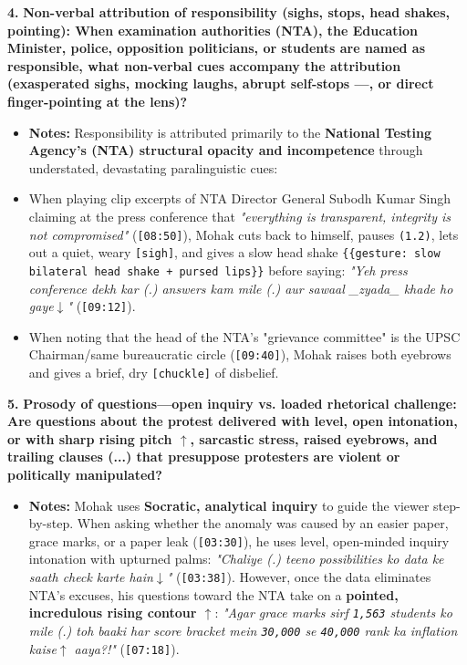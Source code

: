 \documentclass[10pt,a4paper]{article}
\begin{document}
\noindent\textbf{4.} \textbf{Non-verbal attribution of responsibility (sighs, stops, head shakes, pointing): When examination authorities (NTA), the Education Minister, police, opposition politicians, or students are named as responsible, what non-verbal cues accompany the attribution (exasperated sighs, mocking laughs, abrupt self-stops ---, or direct finger-pointing at the lens)?}\par\smallskip
\begin{itemize}
  \item \textbf{Notes:}
Responsibility is attributed primarily to the \textbf{National Testing Agency's (NTA) structural opacity and incompetence} through understated, devastating paralinguistic cues:\par\smallskip
  \item When playing clip excerpts of NTA Director General Subodh Kumar Singh claiming at the press conference that \textit{"everything is transparent, integrity is not compromised"} (\texttt{[08:50]}), Mohak cuts back to himself, pauses \texttt{(1.2)}, lets out a quiet, weary \texttt{[sigh]}, and gives a slow head shake \texttt{\{\{gesture: slow bilateral head shake + pursed lips\}\}} before saying: \textit{"Yeh press conference dekh kar (.) answers kam mile (.) aur sawaal \_zyada\_ khade ho gaye$\downarrow$"} (\texttt{[09:12]}).
  \item When noting that the head of the NTA's "grievance committee" is the UPSC Chairman/same bureaucratic circle (\texttt{[09:40]}), Mohak raises both eyebrows and gives a brief, dry \texttt{[chuckle]} of disbelief.
\end{itemize}

\noindent\textbf{5.} \textbf{Prosody of questions---open inquiry vs. loaded rhetorical challenge: Are questions about the protest delivered with level, open intonation, or with sharp rising pitch $\uparrow$, sarcastic stress, raised eyebrows, and trailing clauses (...) that presuppose protesters are violent or politically manipulated?}\par\smallskip
\begin{itemize}
  \item \textbf{Notes:}
Mohak uses \textbf{Socratic, analytical inquiry} to guide the viewer step-by-step. When asking whether the anomaly was caused by an easier paper, grace marks, or a paper leak (\texttt{[03:30]}), he uses level, open-minded inquiry intonation with upturned palms: \textit{"Chaliye (.) teeno possibilities ko data ke saath check karte hain$\downarrow$"} (\texttt{[03:38]}). However, once the data eliminates NTA's excuses, his questions toward the NTA take on a \textbf{pointed, incredulous rising contour \texttt{$\uparrow$}}: \textit{"Agar grace marks sirf \texttt{1,563} students ko mile (.) toh baaki har score bracket mein \texttt{30,000} se \texttt{40,000} rank ka inflation kaise$\uparrow$ aaya?!"} (\texttt{[07:18]}).\par\smallskip
\end{itemize}
\end{document}
